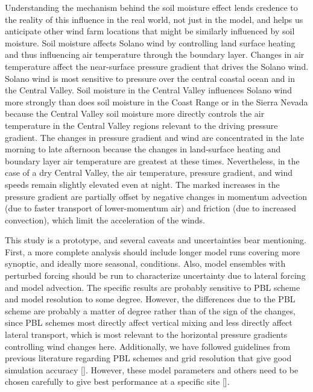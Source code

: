 Understanding the mechanism behind the soil moisture effect lends credence to the reality of this influence in the real world, not just in the model, and helps us anticipate other wind farm locations that might be similarly influenced by soil moisture.  Soil moisture affects Solano wind by controlling land surface heating and thus influencing air temperature through the boundary layer.  Changes in air temperature affect the near-surface pressure gradient that drives the Solano wind.  Solano wind is most sensitive to pressure over the central coastal ocean and in the Central Valley.  Soil moisture in the Central Valley influences Solano wind more strongly than does soil moisture in the Coast Range or in the Sierra Nevada because the Central Valley soil moisture more directly controls the air temperature in the Central Valley regions relevant to the driving pressure gradient.  The changes in pressure gradient and wind are concentrated in the late morning to late afternoon because the changes in land-surface heating and boundary layer air temperature are greatest at these times.  Nevertheless, in the case of a dry Central Valley, the air temperature, pressure gradient, and wind speeds remain slightly elevated even at night.  The marked increases in the pressure gradient are partially offset by negative changes in momentum advection (due to faster transport of lower-momentum air) and friction (due to increased convection), which limit the acceleration of the winds.

This study is a prototype, and several caveats and uncertainties bear mentioning.  First, a more complete analysis should include longer model runs covering more synoptic, and ideally more seasonal, conditions.  Also, model ensembles with perturbed forcing should be run to characterize uncertainty due to lateral forcing and model advection.  The specific results are probably sensitive to PBL scheme and model resolution to some degree.  However, the differences due to the PBL scheme are probably a matter of degree rather than of the sign of the changes, since PBL schemes most directly affect vertical mixing and less directly affect lateral transport, which is most relevant to the horizontal pressure gradients controlling wind changes here.  Additionally, we have followed guidelines from previous literature regarding PBL schemes and grid resolution that give good simulation accuracy [\cite{marjanovic2014}].  However, these model parameters and others need to be chosen carefully to give best performance at a specific site [\cite{wharton2011review}].

